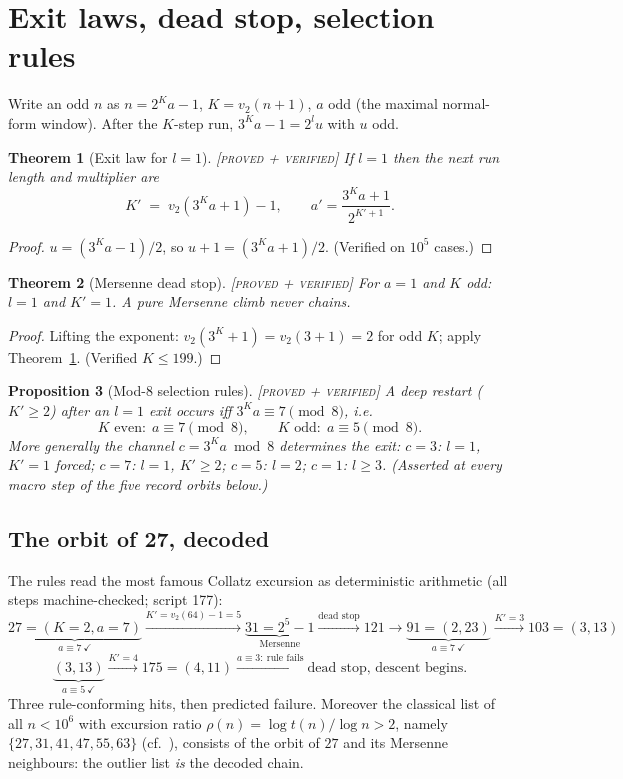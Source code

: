 \documentclass[11pt]{article}
\newtheorem{theorem}{Theorem}[section]
\newtheorem{proposition}[theorem]{Proposition}
\theoremstyle{definition}
\newcommand{\PROVEDVER}{\textup{[\textsc{proved + verified}]}}
\newcommand{\vv}{v_2}
\begin{document}
\section{Exit laws, dead stop, selection rules}\label{sec:exit}
Write an odd $n$ as $n=2^{K}a-1$, $K=\vv(n+1)$, $a$ odd (the maximal
normal-form window). After the $K$-step run, $3^{K}a-1=2^{l}u$ with $u$ odd.

\begin{theorem}[Exit law for $l=1$]\label{thm:exit} \PROVEDVER\;
If $l=1$ then the next run length and multiplier are
\[
K' \;=\; \vv\!\left(3^{K}a+1\right)-1,\qquad a'=\frac{3^{K}a+1}{2^{K'+1}} .
\]
\end{theorem}
\begin{proof}
$u=(3^Ka-1)/2$, so $u+1=(3^Ka+1)/2$. (Verified on $10^{5}$ cases.)
\end{proof}

\begin{theorem}[Mersenne dead stop]\label{thm:deadstop} \PROVEDVER\;
For $a=1$ and $K$ odd: $l=1$ and $K'=1$. A pure Mersenne climb never chains.
\end{theorem}
\begin{proof}
Lifting the exponent: $\vv(3^{K}+1)=\vv(3+1)=2$ for odd $K$; apply
Theorem~\ref{thm:exit}. (Verified $K\le 199$.)
\end{proof}

\begin{proposition}[Mod-8 selection rules]\label{prop:sel} \PROVEDVER\;
A deep restart ($K'\ge 2$) after an $l=1$ exit occurs iff $3^{K}a\equiv 7
\pmod 8$, i.e.
\[
K \text{ even}:\; a\equiv 7 \pmod 8,\qquad
K \text{ odd}:\; a\equiv 5 \pmod 8 .
\]
More generally the channel $c=3^{K}a \bmod 8$ determines the exit:
$c=3$: $l=1$, $K'=1$ forced; $c=7$: $l=1$, $K'\ge2$; $c=5$: $l=2$; $c=1$:
$l\ge3$. (Asserted at every macro step of the five record orbits below.)
\end{proposition}

\subsection{The orbit of 27, decoded}
The rules read the most famous Collatz excursion as deterministic arithmetic
(all steps machine-checked; script 177):
\[
\underbrace{27=(K{=}2,a{=}7)}_{a\equiv 7\ \checkmark}
\xrightarrow{K'=\vv(64)-1=5} \underbrace{31=2^5-1}_{\text{Mersenne}}
\xrightarrow{\text{dead stop}} 121
\to \underbrace{91=(2,23)}_{a\equiv 7\ \checkmark}
\xrightarrow{K'=3} 103=(3,13)
\]
\[
\underbrace{(3,13)}_{a\equiv 5\ \checkmark}
\xrightarrow{K'=4} 175=(4,11)
\xrightarrow{a\equiv 3:\ \text{rule fails}} \text{dead stop, descent begins.}
\]
Three rule-conforming hits, then predicted failure. Moreover the classical
list of all $n<10^{6}$ with excursion ratio $\rho(n)=\log t(n)/\log n>2$,
namely $\{27,31,41,47,55,63\}$ (cf.~\cite{KL-survey}), consists of the orbit
of $27$ and its Mersenne neighbours: the outlier list \emph{is} the decoded
chain.
\end{document}
